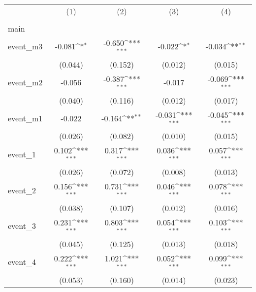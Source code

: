 {
\def\sym#1{\ifmmode^{#1}\else\(^{#1}\)\fi}
\begin{tabular}{l*{4}{c}}
\hline\hline
                    &\multicolumn{1}{c}{(1)}&\multicolumn{1}{c}{(2)}&\multicolumn{1}{c}{(3)}&\multicolumn{1}{c}{(4)}\\
                    &\multicolumn{1}{c}{} &\multicolumn{1}{c}{} &\multicolumn{1}{c}{} &\multicolumn{1}{c}{} \\
\hline
main                &                     &                     &                     &                     \\
event\_m3            &      -0.081\sym{*}  &      -0.650\sym{***}&      -0.022\sym{*}  &      -0.034\sym{**} \\
                    &     (0.044)         &     (0.152)         &     (0.012)         &     (0.015)         \\
[1em]
event\_m2            &      -0.056         &      -0.387\sym{***}&      -0.017         &      -0.069\sym{***}\\
                    &     (0.040)         &     (0.116)         &     (0.012)         &     (0.017)         \\
[1em]
event\_m1            &      -0.022         &      -0.164\sym{**} &      -0.031\sym{***}&      -0.045\sym{***}\\
                    &     (0.026)         &     (0.082)         &     (0.010)         &     (0.015)         \\
[1em]
event\_1             &       0.102\sym{***}&       0.317\sym{***}&       0.036\sym{***}&       0.057\sym{***}\\
                    &     (0.026)         &     (0.072)         &     (0.008)         &     (0.013)         \\
[1em]
event\_2             &       0.156\sym{***}&       0.731\sym{***}&       0.046\sym{***}&       0.078\sym{***}\\
                    &     (0.038)         &     (0.107)         &     (0.012)         &     (0.016)         \\
[1em]
event\_3             &       0.231\sym{***}&       0.803\sym{***}&       0.054\sym{***}&       0.103\sym{***}\\
                    &     (0.045)         &     (0.125)         &     (0.013)         &     (0.018)         \\
[1em]
event\_4             &       0.222\sym{***}&       1.021\sym{***}&       0.052\sym{***}&       0.099\sym{***}\\
                    &     (0.053)         &     (0.160)         &     (0.014)         &     (0.023)         \\

\end{tabular}}
